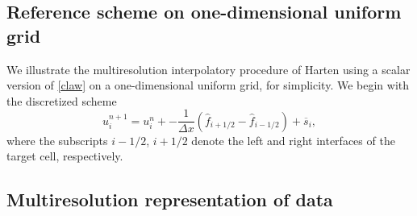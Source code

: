 \documentclass[]{article}
\begin{document}
    \subsection{Reference scheme on one-dimensional uniform grid}

        We illustrate the multiresolution interpolatory procedure of Harten
        using a scalar version of \ref{claw} on a one-dimensional uniform grid,
        for simplicity. We begin with the discretized scheme
        \begin{equation}
            u^{n+1}_{i} = u^{n}_{i} + -\frac{1}{\Delta x} \left( \hat{f}_{i+1/2} -
            \hat{f}_{i-1/2} \right) + \overline{s}_{i},
            \label{refeq}
        \end{equation}
        where the subscripts $i-1/2$, $i+1/2$ denote the left and right
        interfaces of the target cell, respectively.

    \subsection{Multiresolution representation of data}
\end{document}
